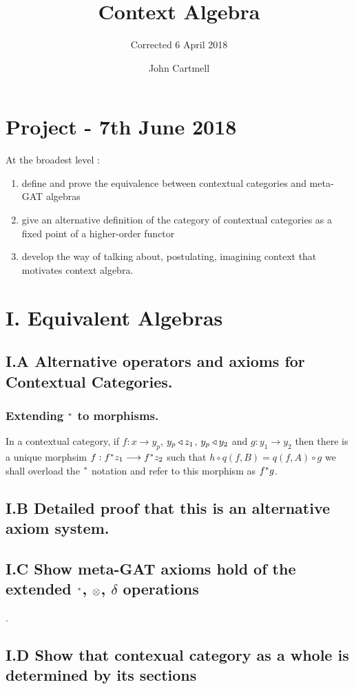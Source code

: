 \documentclass[10pt,a4paper]{scrartcl}
\title{Context Algebra}
\subtitle{Corrected 6 April 2018}
\author{John Cartmell}
\begin{document}
\maketitle


\section{Project - 7th June 2018 }
At the broadest level :
\begin{enumerate}[I]
	\item define and prove the equivalence between contextual categories and meta-GAT algebras
	\item give an alternative definition of the category of contextual categories as a fixed point of a higher-order functor
	\item develop the way of talking about, postulating, imagining context that motivates context algebra. 
\end{enumerate}
\section{I. Equivalent Algebras}
\subsection{I.A Alternative operators and axioms for Contextual Categories.}
\subsubsection{Extending $^*$ to morphisms.}
In a contextual category, if $f: x \longrightarrow y_p$, $y_p \triangleleft z_1$,
$y_p \triangleleft y_2$ and $g: y_1 \longrightarrow y_2$ then 
there is a unique morphsim $f: f ^* z_1 \longrightarrow f ^* z_2$ such that 
$h \circ q(f,B) = q(f,A) \circ g$ we shall overload the $^*$ notation and refer to this morphism as $f^* g$. 

\subsection{I.B Detailed proof that this is an alternative axiom system.}

\subsection{I.C Show meta-GAT axioms hold of the extended $^*$, $\otimes$, $\delta$
operations}.
\subsection {I.D Show that contexual category as a whole is determined by its sections}
\end{document}
